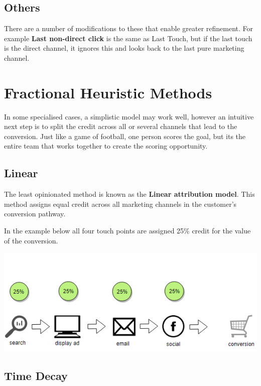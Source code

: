\documentclass[]{book}
\begin{document}
\subsection{Others}\label{others}

There are a number of modifications to these that enable greater
refinement. For example \textbf{Last non-direct click} is the same as
Last Touch, but if the last touch is the direct channel, it ignores this
and looks back to the last pure marketing channel.

\section{Fractional Heuristic
Methods}\label{fractional-heuristic-methods}

In some specialised cases, a simplistic model may work well, however an
intuitive next step is to split the credit across all or several
channels that lead to the conversion. Just like a game of football, one
person scores the goal, but its the entire team that works together to
create the scoring opportunity.

\subsection{Linear}\label{linear}

The least opinionated method is known as the \textbf{Linear attribution
model}. This method assigns equal credit across all marketing channels
in the customer's conversion pathway.

In the example below all four touch points are assigned 25\% credit for
the value of the conversion.

\includegraphics[width=5.61in]{img/linear}

\subsection{Time Decay}\label{time-decay}
\end{document}
